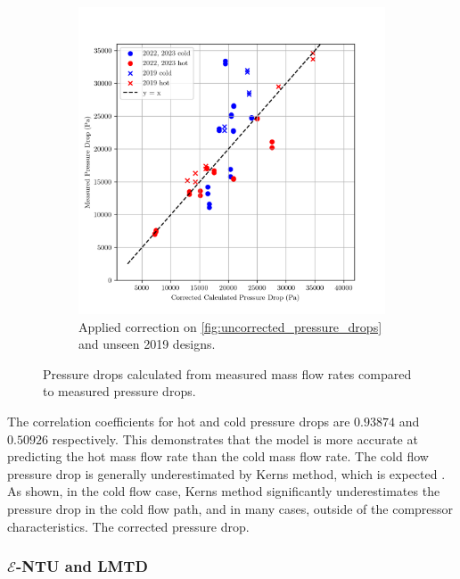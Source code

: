 \documentclass{article}
\begin{document}
\begin{figure}[H]
\begin{subfigure}{.49\textwidth}
    \includegraphics[width=.99\linewidth]{dp_ccalc_vs_meas.png}
    \caption{Applied correction on \ref{fig:uncorrected_pressure_drops} and unseen 2019 designs.}
    \label{fig:corrected_pressure_drops}
  \end{subfigure}
    
  \caption{Pressure drops calculated from measured mass flow rates compared to measured pressure drops.}
  \label{fig:pressure_drops}

\end{figure}

The correlation coefficients for hot and cold pressure drops are $\mathbf{0.93874}$ and $\mathbf{0.50926}$ respectively.
This demonstrates that the model is more accurate at predicting the hot mass flow rate than the cold mass flow rate.
The cold flow pressure drop is generally underestimated by Kerns method, which is expected \cite{HE_design}.
As shown, in the cold flow case, Kerns method significantly underestimates the pressure drop in the cold flow path, and in many cases, outside of the compressor characteristics.
The corrected pressure drop.

\subsubsection{$\mathcal{E}$-NTU and LMTD}
\end{document}
